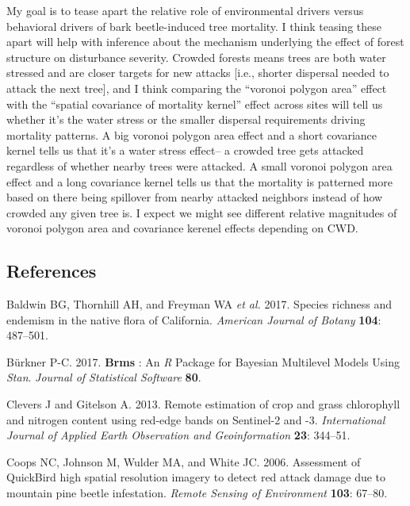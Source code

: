 \documentclass[]{article}
\begin{document}
My goal is to tease apart the relative role of environmental drivers
versus behavioral drivers of bark beetle-induced tree mortality. I think
teasing these apart will help with inference about the mechanism
underlying the effect of forest structure on disturbance severity.
Crowded forests means trees are both water stressed and are closer
targets for new attacks {[}i.e., shorter dispersal needed to attack the
next tree{]}, and I think comparing the ``voronoi polygon area'' effect
with the ``spatial covariance of mortality kernel'' effect across sites
will tell us whether it's the water stress or the smaller dispersal
requirements driving mortality patterns. A big voronoi polygon area
effect and a short covariance kernel tells us that it's a water stress
effect-- a crowded tree gets attacked regardless of whether nearby trees
were attacked. A small voronoi polygon area effect and a long covariance
kernel tells us that the mortality is patterned more based on there
being spillover from nearby attacked neighbors instead of how crowded
any given tree is. I expect we might see different relative magnitudes
of voronoi polygon area and covariance kerenel effects depending on CWD.

\subsection*{References}\label{references}

\hypertarget{refs}{}
\hypertarget{ref-baldwin2017a}{}
Baldwin BG, Thornhill AH, and Freyman WA \emph{et al.} 2017. Species
richness and endemism in the native flora of California. \emph{American
Journal of Botany} \textbf{104}: 487--501.

\hypertarget{ref-burkner2017}{}
Bürkner P-C. 2017. \textbf{Brms} : An \emph{R} Package for Bayesian
Multilevel Models Using \emph{Stan}. \emph{Journal of Statistical
Software} \textbf{80}.

\hypertarget{ref-clevers2013}{}
Clevers J and Gitelson A. 2013. Remote estimation of crop and grass
chlorophyll and nitrogen content using red-edge bands on Sentinel-2 and
-3. \emph{International Journal of Applied Earth Observation and
Geoinformation} \textbf{23}: 344--51.

\hypertarget{ref-coops2006}{}
Coops NC, Johnson M, Wulder MA, and White JC. 2006. Assessment of
QuickBird high spatial resolution imagery to detect red attack damage
due to mountain pine beetle infestation. \emph{Remote Sensing of
Environment} \textbf{103}: 67--80.
\end{document}
